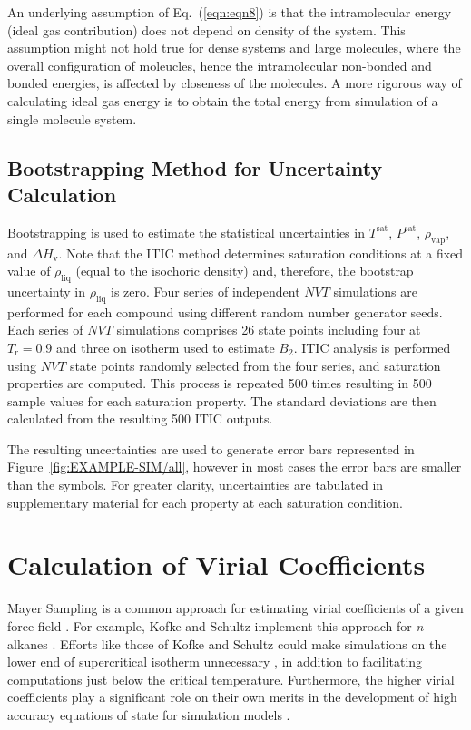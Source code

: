\documentclass[5p,times]{elsarticle}
\begin{document}
An underlying assumption of Eq.~(\ref{eqn:eqn8}) is that the intramolecular energy (ideal gas contribution) does not depend on density of the system. This assumption might not hold true for dense systems and large molecules, where the overall configuration of moleucles, hence the intramolecular non-bonded and bonded energies, is affected by closeness of the molecules. A more rigorous way of calculating ideal gas energy is to obtain the total energy from simulation of a single molecule system. 


\subsection{Bootstrapping Method for Uncertainty Calculation}\label{sec:bootstrapping}
Bootstrapping is used to estimate the statistical uncertainties \cite{Efron1981} in $T^\mathrm{sat}$, $P^\mathrm{sat}$, $\rho_\mathrm{vap}$, and $\Delta H_\mathrm{v}$. Note that the ITIC method determines saturation conditions at a fixed value of $\rho_{\mathrm{liq}}$ (equal to the isochoric density) and, therefore, the bootstrap uncertainty in $\rho_{\mathrm{liq}}$ is zero. Four series of independent $NVT$ simulations are performed for each compound using different random number generator seeds. Each series of $NVT$ simulations comprises 26 state points including four at $T_\mathrm{r}=0.9$ and three on isotherm used to estimate $B_2$. ITIC analysis is performed using $NVT$ state points randomly selected from the four series, and saturation properties are computed. This process is repeated 500 times resulting in 500 sample values for each saturation property. The standard deviations are then calculated from the resulting 500 ITIC outputs. 

The resulting uncertainties are used to generate error bars represented in Figure~\ref{fig:EXAMPLE-SIM/all}, however in most cases the error bars are smaller than the symbols. For greater clarity, uncertainties are tabulated in supplementary material for each property at each saturation condition.

\section{Calculation of Virial Coefficients} \label{sec:VirialCalc}
Mayer Sampling is a common approach for estimating virial coefficients of a given force field \cite{singh2004mayer}. For example, Kofke and Schultz implement this approach for \textit{n}-alkanes \cite{Schultz2010a}. Efforts like those of Kofke and Schultz could make simulations on the lower end of supercritical isotherm unnecessary \cite{barlow2015communication}, in addition to facilitating computations just below the critical temperature.  Furthermore, the higher virial coefficients play a significant role on their own merits in the development of high accuracy equations of state for simulation models \cite{thol2016equation}.
\end{document}

